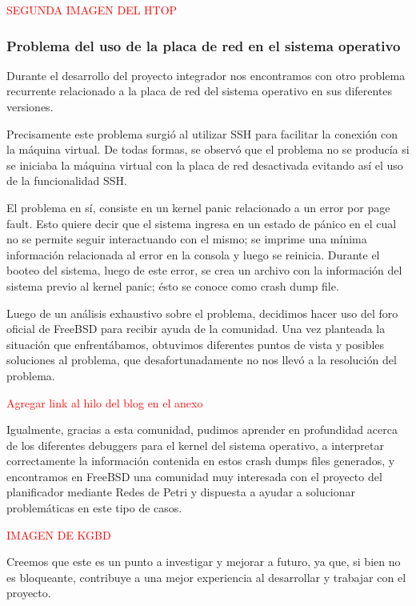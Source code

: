 \textcolor{red}{SEGUNDA IMAGEN DEL HTOP}


\subsubsection{Problema del uso de la placa de red en el sistema operativo}

Durante el desarrollo del proyecto integrador nos encontramos con otro problema recurrente relacionado a la placa de red del sistema operativo en sus diferentes versiones.

Precisamente este problema surgió al utilizar SSH para facilitar la conexión con la máquina virtual. De todas formas, se observó que el problema no se producía si se iniciaba la máquina virtual con la placa de red desactivada evitando así el uso de la funcionalidad SSH.

El problema en sí, consiste en un kernel panic relacionado a un error por page fault. Esto quiere decir que el sistema ingresa en un estado de pánico en el cual no se permite seguir interactuando con el mismo; se imprime una mínima información relacionada al error en la consola y luego se reinicia. Durante el booteo del sistema, luego de este error, se crea un archivo con la información del sistema previo al kernel panic; ésto se conoce como crash dump file.

Luego de un análisis exhaustivo sobre el problema, decidimos hacer uso del foro oficial de FreeBSD para recibir ayuda de la comunidad. Una vez planteada la situación que enfrentábamos, obtuvimos diferentes puntos de vista y posibles soluciones al problema, que desafortunadamente no nos llevó a la resolución del problema.

\textcolor{red}{Agregar link al hilo del blog  en el anexo}

Igualmente, gracias a esta comunidad, pudimos aprender en profundidad acerca de los diferentes debuggers para el kernel del sistema operativo, a interpretar correctamente la información contenida en estos crash dumps files generados, y encontramos en FreeBSD una comunidad muy interesada con el proyecto del planificador mediante Redes de Petri y dispuesta a ayudar a solucionar problemáticas en este tipo de casos.

\textcolor{red}{IMAGEN DE KGBD}

Creemos que este es un punto a investigar y mejorar a futuro, ya que, si bien no es bloqueante, contribuye a una mejor experiencia al desarrollar y trabajar con el proyecto.
